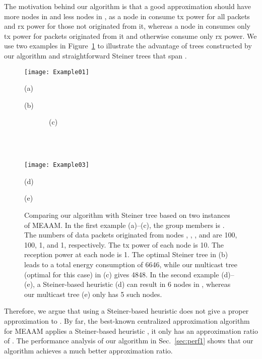 \documentclass[10pt, conference, compsocconf]{IEEEtran}
\begin{document}
    The motivation behind our algorithm is that a good approximation  should have more nodes in  and less nodes in , as a node in  consume tx power for all packets and rx power for those not originated from it, whereas a node in  consumes only tx power for packets originated from it and otherwise consume only rx power. We use two examples in Figure~\ref{fig:example} to illustrate the advantage of trees constructed by our algorithm and straightforward Steiner trees that span .
\begin{figure}[htbp]
      \centerline{\texttt{[image: Example01]}}
      \parbox{.32\columnwidth}{\center\scriptsize(a)~~~~~~~}
      \parbox{.32\columnwidth}{\center\scriptsize(b)}
      \parbox{.32\columnwidth}{\center~~~~~~~\scriptsize(c)} \\ \\
      \centerline{\texttt{[image: Example03]}}
      \parbox{.49\columnwidth}{\center\scriptsize(d)}
      \parbox{.49\columnwidth}{\center\scriptsize(e)}
      \caption{Comparing our algorithm with Steiner tree based on two instances of MEAAM. In the first example (a)--(c), the group members is . The numbers of data packets originated from nodes , , , and  are 100, 100, 1, and 1, respectively. The tx power of each node is 10. The reception power at each node is 1. The optimal Steiner tree in (b) leads to a total energy consumption of 6646, while our multicast tree (optimal for this case) in (c) gives 4848. In the second example (d)--(e), a Steiner-based heuristic (d) can result in 6 nodes in , whereas our multicast tree (e) only has 5 such nodes.}
      \label{fig:example}
    \end{figure}
Therefore, we argue that using a Steiner-based heuristic does not give a proper approximation to . By far, the best-known centralized approximation algorithm for MEAAM applies a Steiner-based heuristic \cite{Liang2009}, it only has an approximation ratio of . The performance analysis of our algorithm in Sec.~\ref{sec:perf1} shows that our algorithm achieves a much better approximation ratio.
\end{document}
